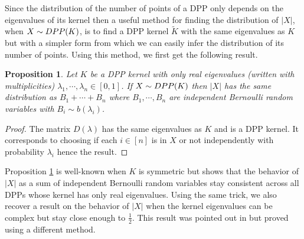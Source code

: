 \documentclass{article}
\numberwithin{equation}{section}
\renewcommand{\tilde}{\widetilde}
\newcommand{\DPP}{\textnormal{DPP}}
\theoremstyle{plain}
\newtheorem{proposition}{Proposition}[section]
\begin{document}
\noindent Since the distribution of the number of points of a DPP only depends on the eigenvalues of its kernel then a useful method for finding the distribution of $|X|$, when $X\sim\DPP(K)$, is to find a DPP kernel $\tilde K$ with the same eigenvalues as $K$ but with a simpler form from which we can easily infer the distribution of its number of points. Using this method, we first get the following result.

\begin{proposition}\label{prop: Dist_number_point_1}
Let $K$ be a DPP kernel with only real eigenvalues (written with multiplicities) $\lambda_1,\cdots,\lambda_n\in [0, 1]$. If $X\sim\DPP(K)$ then $|X|$ has the same distribution as $B_1+\cdots+B_n$ where $B_1,\cdots, B_n$ are independent Bernoulli random variables with $B_i\sim b(\lambda_i)$.
\end{proposition}
\begin{proof}
The matrix $D(\lambda)$ has the same eigenvalues as $K$ and is a DPP kernel. It corresponds to choosing if each $i\in [n]$ is in $X$ or not independently with probability $\lambda_i$ hence the result.
\end{proof}

\noindent Proposition \ref{prop: Dist_number_point_1} is well-known when $K$ is symmetric but shows that the behavior of $|X|$ as a sum of independent Bernoulli random variables stay consistent across all DPPs whose kernel has only real eigenvalues. Using the same trick, we also recover a result on the behavior of $|X|$ when the kernel eigenvalues can be complex but stay close enough to $\frac{1}{2}$. This result was pointed out in \cite{Brunel18} but proved using a different method.
\end{document}
